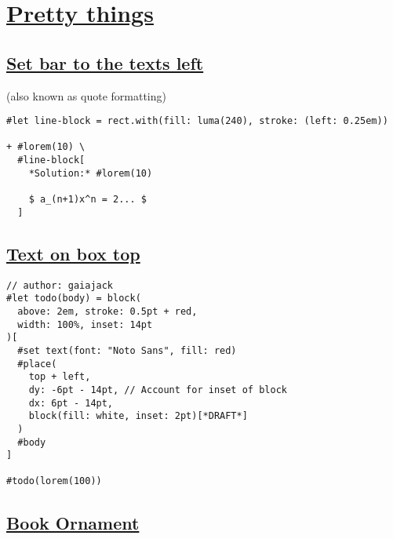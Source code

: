 \section{\texorpdfstring{\hyperref[pretty-things]{Pretty
things}}{Pretty things}}\label{pretty-things}

\subsection{\texorpdfstring{\hyperref[set-bar-to-the-texts-left]{Set bar
to the text\textquotesingle s
left}}{Set bar to the text\textquotesingle s left}}\label{set-bar-to-the-texts-left}

(also known as quote formatting)

\begin{verbatim}
#let line-block = rect.with(fill: luma(240), stroke: (left: 0.25em))

+ #lorem(10) \
  #line-block[
    *Solution:* #lorem(10)

    $ a_(n+1)x^n = 2... $
  ]
\end{verbatim}

\pandocbounded{}

\subsection{\texorpdfstring{\hyperref[text-on-box-top]{Text on box
top}}{Text on box top}}\label{text-on-box-top}

\begin{verbatim}
// author: gaiajack
#let todo(body) = block(
  above: 2em, stroke: 0.5pt + red,
  width: 100%, inset: 14pt
)[
  #set text(font: "Noto Sans", fill: red)
  #place(
    top + left,
    dy: -6pt - 14pt, // Account for inset of block
    dx: 6pt - 14pt,
    block(fill: white, inset: 2pt)[*DRAFT*]
  )
  #body
]

#todo(lorem(100))
\end{verbatim}

\pandocbounded{}

\subsection{\texorpdfstring{\hyperref[book-ornament]{Book
Ornament}}{Book Ornament}}\label{book-ornament}

